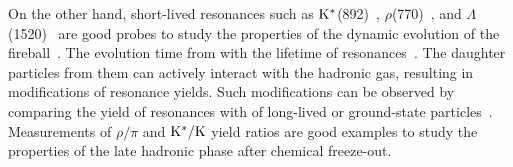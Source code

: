 On the other hand, \DIFdelbegin {}\DIFdelend \DIFaddbegin {}\DIFaddend short-lived resonances such as $\rm{}K^{*}$(892)~\cite{ALICE:2019etb, ALICE:2016sak}, $\rho$(770)~\cite{ALICE:2018qdv}, and $\Lambda$(1520)~\cite{ALICE:2018ewo} are good probes to study the properties of the dynamic evolution of the fireball~\cite{Bierlich:2021poz}. The evolution time from \DIFdelbegin {}\DIFdelend \DIFaddbegin {}\DIFaddend with the lifetime of resonances~\cite{ALICE:2011dyt, ALICE:2019xyr}. The daughter particles from them can actively interact with the hadronic gas, resulting in modifications of resonance yields. Such modifications can be observed by comparing the yield of resonances with \DIFdelbegin {}\DIFdelend \DIFaddbegin {}\DIFaddend of long-lived or ground-state particles~\cite{ALICE:2018pal}. Measurements of $\rho/\pi$ and $\rm{}K^{*}/K$ yield ratios are good examples to study the properties of the late hadronic phase after \DIFaddbegin {}\DIFaddend chemical freeze-out.

